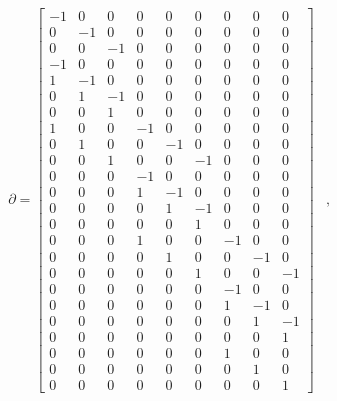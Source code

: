 \begin{example}
\[
   \begin{array}{ll}
	
	\partial = \left[ \begin{array}{ccccccccc}
	 -1 & 0 & 0 & 0 & 0 & 0 & 0 & 0 & 0 \\
	 0 & -1 & 0 & 0 & 0 & 0 & 0 & 0 & 0 \\	 
	 0 & 0 & -1 & 0 & 0 & 0 & 0 & 0 & 0 \\	 
	 -1 & 0 & 0 & 0 & 0 & 0 & 0 & 0 & 0 \\	 
	 1 & -1 & 0 & 0 & 0 & 0 & 0 & 0 & 0 \\	 
	 0 & 1 & -1 & 0 & 0 & 0 & 0 & 0 & 0 \\	 
	 0 & 0 & 1 & 0 & 0 & 0 & 0 & 0 & 0 \\	 
	 1 & 0 & 0 & -1 & 0 & 0 & 0 & 0 & 0 \\	 
	 0 & 1 & 0 & 0 & -1 & 0 & 0 & 0 & 0 \\	 
	 0 & 0 & 1 & 0 & 0 & -1 & 0 & 0 & 0 \\	 
	 0 & 0 & 0 & -1 & 0 & 0 & 0 & 0 & 0 \\	 
	 0 & 0 & 0 & 1 & -1 & 0 & 0 & 0 & 0 \\	 
	 0 & 0 & 0 & 0 & 1 & -1 & 0 & 0 & 0 \\	 
	 0 & 0 & 0 & 0 & 0 & 1 & 0 & 0 & 0 \\	 
	 0 & 0 & 0 & 1 & 0 & 0 & -1 & 0 & 0 \\	 
	 0 & 0 & 0 & 0 & 1 & 0 & 0 & -1 & 0 \\	 
	 0 & 0 & 0 & 0 & 0 & 1 & 0 & 0 & -1 \\	 
	 0 & 0 & 0 & 0 & 0 & 0 & -1 & 0 & 0 \\	 
	 0 & 0 & 0 & 0 & 0 & 0 & 1 & -1 & 0 \\	 
	 0 & 0 & 0 & 0 & 0 & 0 & 0 & 1 & -1 \\	 
	 0 & 0 & 0 & 0 & 0 & 0 & 0 & 0 & 1 \\	 
	 0 & 0 & 0 & 0 & 0 & 0 & 1 & 0 & 0 \\	 
	 0 & 0 & 0 & 0 & 0 & 0 & 0 & 1 & 0 \\	 
	 0 & 0 & 0 & 0 & 0 & 0 & 0 & 0 & 1	 	 	 	 	 	 	 		\end{array}\right] &, \qquad
	 

\end{array}\]
\end{example}
